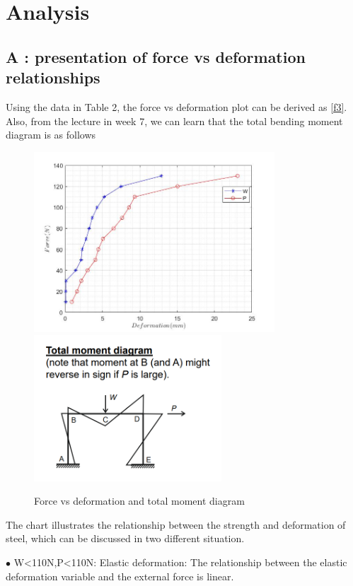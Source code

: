 \section{Analysis}
\FloatBarrier %

\subsection*{A : presentation of force vs deformation relationships}
Using the data in Table 2, the force vs deformation plot can be derived as \autoref{f3}. Also, from the lecture in week 7, we can learn that the total bending moment diagram is as follows


\begin{figure}[htbp]
    \centering
    \includegraphics[width=9cm]{./fig/17.jpg}
    \includegraphics[width=7cm]{./fig/16.png}
    \caption{Force vs deformation and total moment diagram}
    \label{f4}
\end{figure}


The chart illustrates the relationship between the strength and deformation of steel, which can be discussed in two different situation.

$\bullet$ W<110N,P<110N: Elastic deformation: The relationship between the elastic deformation variable and the external force is linear.

